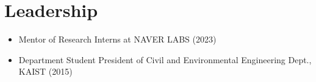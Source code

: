 \section{Leadership}

\begin{itemize}[label=$\cdot$]

    \item Mentor of Research Interns at NAVER LABS (2023) 
    
    \vspace{-1mm}
    \item Department Student President of Civil and Environmental Engineering Dept., KAIST (2015) 
    
\end{itemize}

